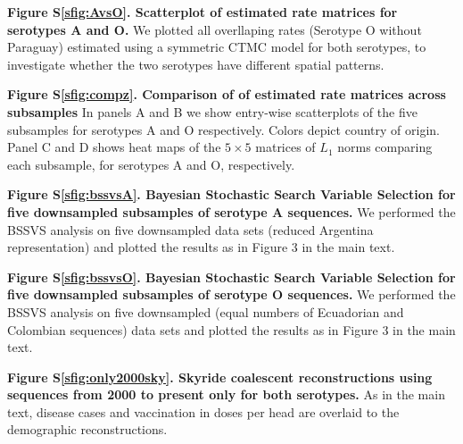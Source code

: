 \documentclass[a4paper,10pt]{article}
\begin{document}
\textbf{Figure S\ref{sfig:AvsO}. Scatterplot of estimated rate matrices for serotypes A and O.}
We plotted all overllaping rates (Serotype O without Paraguay) estimated using a symmetric CTMC model for both serotypes, to investigate whether the two serotypes have different spatial patterns.

\textbf{Figure S\ref{sfig:compz}. Comparison of of estimated rate matrices across subsamples}
In panels A and B we show entry-wise scatterplots of the five subsamples for serotypes A and O respectively.
Colors depict country of origin.
Panel C and D shows heat maps of the $5\times5$ matrices of $L_1$ norms comparing each subsample, for serotypes A and O, respectively.

\textbf{Figure S\ref{sfig:bssvsA}. Bayesian Stochastic Search Variable Selection for five downsampled subsamples of serotype A sequences.}
We performed the BSSVS analysis on five downsampled data sets (reduced Argentina representation) and plotted the results as in Figure 3 in the main text.

\textbf{Figure S\ref{sfig:bssvsO}. Bayesian Stochastic Search Variable Selection for five downsampled subsamples of serotype O sequences.}
We performed the BSSVS analysis on five downsampled (equal numbers of Ecuadorian and Colombian sequences) data sets and plotted the results as in Figure 3 in the main text.

\textbf{Figure S\ref{sfig:only2000sky}. Skyride coalescent reconstructions using sequences from 2000 to present only for both serotypes.}
As in the main text, disease cases and vaccination in doses per head are overlaid to the demographic reconstructions.

\newpage

\end{document}
